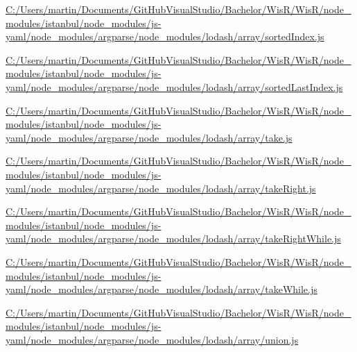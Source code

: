 \begin{DoxyCompactItemize}
\item 
\hyperlink{_c_1_2_users_2martin_2_documents_2_git_hub_visual_studio_2_bachelor_2_wis_r_2_wis_r_2node_module52061ce0f65a6be4b1a27019a989efcb}{C\+:/\+Users/martin/\+Documents/\+Git\+Hub\+Visual\+Studio/\+Bachelor/\+Wis\+R/\+Wis\+R/node\+\_\+modules/istanbul/node\+\_\+modules/js-\/yaml/node\+\_\+modules/argparse/node\+\_\+modules/lodash/array/sorted\+Index.\+js}
\item 
\hyperlink{_c_1_2_users_2martin_2_documents_2_git_hub_visual_studio_2_bachelor_2_wis_r_2_wis_r_2node_module7bf129ee8c89851ae61797de90be4120}{C\+:/\+Users/martin/\+Documents/\+Git\+Hub\+Visual\+Studio/\+Bachelor/\+Wis\+R/\+Wis\+R/node\+\_\+modules/istanbul/node\+\_\+modules/js-\/yaml/node\+\_\+modules/argparse/node\+\_\+modules/lodash/array/sorted\+Last\+Index.\+js}
\item 
\hyperlink{_c_1_2_users_2martin_2_documents_2_git_hub_visual_studio_2_bachelor_2_wis_r_2_wis_r_2node_module5dea190d20b3164d0dc263a567f64e5b}{C\+:/\+Users/martin/\+Documents/\+Git\+Hub\+Visual\+Studio/\+Bachelor/\+Wis\+R/\+Wis\+R/node\+\_\+modules/istanbul/node\+\_\+modules/js-\/yaml/node\+\_\+modules/argparse/node\+\_\+modules/lodash/array/take.\+js}
\item 
\hyperlink{_c_1_2_users_2martin_2_documents_2_git_hub_visual_studio_2_bachelor_2_wis_r_2_wis_r_2node_module242b2be171372ef6272c897827747cf5}{C\+:/\+Users/martin/\+Documents/\+Git\+Hub\+Visual\+Studio/\+Bachelor/\+Wis\+R/\+Wis\+R/node\+\_\+modules/istanbul/node\+\_\+modules/js-\/yaml/node\+\_\+modules/argparse/node\+\_\+modules/lodash/array/take\+Right.\+js}
\item 
\hyperlink{_c_1_2_users_2martin_2_documents_2_git_hub_visual_studio_2_bachelor_2_wis_r_2_wis_r_2node_module35d017b7e8d83542b3717c2509792d01}{C\+:/\+Users/martin/\+Documents/\+Git\+Hub\+Visual\+Studio/\+Bachelor/\+Wis\+R/\+Wis\+R/node\+\_\+modules/istanbul/node\+\_\+modules/js-\/yaml/node\+\_\+modules/argparse/node\+\_\+modules/lodash/array/take\+Right\+While.\+js}
\item 
\hyperlink{_c_1_2_users_2martin_2_documents_2_git_hub_visual_studio_2_bachelor_2_wis_r_2_wis_r_2node_modulef5404818e4fc043cb92f8be5b27dab4b}{C\+:/\+Users/martin/\+Documents/\+Git\+Hub\+Visual\+Studio/\+Bachelor/\+Wis\+R/\+Wis\+R/node\+\_\+modules/istanbul/node\+\_\+modules/js-\/yaml/node\+\_\+modules/argparse/node\+\_\+modules/lodash/array/take\+While.\+js}
\item 
\hyperlink{_c_1_2_users_2martin_2_documents_2_git_hub_visual_studio_2_bachelor_2_wis_r_2_wis_r_2node_module078541c762ecf82a7e964218681e4d05}{C\+:/\+Users/martin/\+Documents/\+Git\+Hub\+Visual\+Studio/\+Bachelor/\+Wis\+R/\+Wis\+R/node\+\_\+modules/istanbul/node\+\_\+modules/js-\/yaml/node\+\_\+modules/argparse/node\+\_\+modules/lodash/array/union.\+js}

\end{DoxyCompactItemize}
